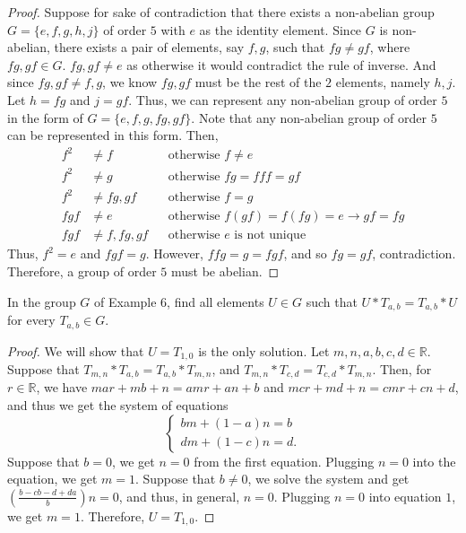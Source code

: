 \documentclass[addpoints, 11pt]{exam}
\newcommand*{\R}{\mathbb{R}}
\newenvironment{question}[1]{\smallskip\noindent\color{crimson}{\bf Question #1.}}{}
\begin{document}
\begin{proof}
    Suppose for sake of contradiction that there exists a non-abelian group $G = \{e, f, g, h, j\}$ of order $5$ with $e$ as the identity element. Since $G$ is non-abelian, there exists a pair of elements, say $f, g$, such that $fg \neq gf$, where $fg, gf \in G$. $fg, gf \neq e$ as otherwise it would contradict the rule of inverse. And since $fg, gf \neq f, g$, we know $fg, gf$ must be the rest of the $2$ elements, namely $h, j$. Let $h = fg$ and $j = gf$. Thus, we can represent any non-abelian group of order $5$ in the form of $G = \{e, f, g, fg, gf\}$. Note that any non-abelian group of order $5$ can be represented in this form. Then,
    \begin{align*}
        f^2 &\neq f && \text{otherwise } f \neq e \\
        f^2 &\neq g && \text{otherwise } fg = fff = gf \\
        f^2 &\neq fg, gf && \text{otherwise } f = g \\
        fgf &\neq e && \text{otherwise } f(gf) = f(fg) = e \rightarrow gf = fg \\
        fgf &\neq f,fg,gf && \text{otherwise } e \text{ is not unique}
    \end{align*}
    Thus, $f^2 = e$ and $fgf = g$. However, $ffg = g = fgf$, and so $fg = gf$, contradiction. Therefore, a group of order $5$ must be abelian.
\end{proof}

\newpage

\begin{question}{2.1.23}
    In the group $G$ of Example 6, find all elements $U \in G$ such that $U * T_{a, b} = T_{a, b} * U$ for every $T_{a, b} \in G$.
\end{question}

\begin{proof}
    We will show that $U = T_{1,0}$ is the only solution. Let $m, n, a, b, c, d \in \R$. Suppose that $T_{m, n} * T_{a, b} = T_{a, b} * T_{m, n}$, and $T_{m, n} * T_{c, d} = T_{c, d} * T_{m, n}$. Then, for $r \in \R$, we have $mar + mb + n = amr + an + b$ and $mcr + md + n = cmr + cn + d$,  and thus we get the system of equations
    \[
        \begin{cases}
            bm + (1 - a)n = b \\
            dm + (1 - c)n = d.
        \end{cases}
    \]
    Suppose that $b = 0$, we get $n = 0$ from the first equation. Plugging $n = 0$ into the equation, we get $m = 1$. Suppose that $b \neq 0$, we solve the system and get $(\frac{b - cb - d + da}{b})n = 0$, and thus, in general, $n = 0$. Plugging $n = 0$ into equation $1$, we get $m = 1$. Therefore, $U = T_{1, 0}$.

\end{proof}
\end{document}
